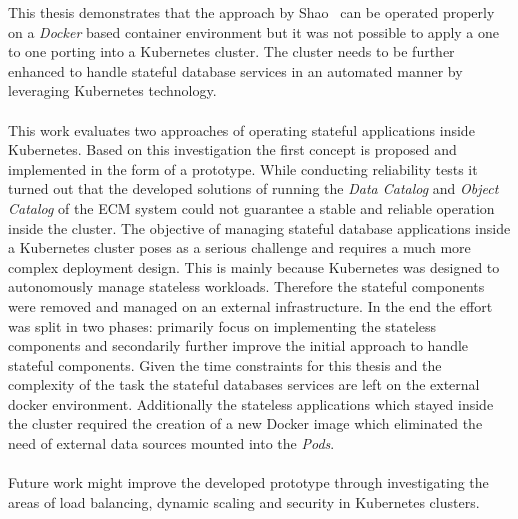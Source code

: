 This thesis demonstrates that the approach by Shao~\cite{shao} can be operated properly on a \textit{Docker} based container environment but it was not possible to apply a one to one porting into a Kubernetes cluster.
The cluster needs to be further enhanced to handle stateful database services in an automated manner by leveraging Kubernetes technology.
\\
\\
This work evaluates two approaches of operating stateful applications inside Kubernetes.
Based on this investigation the first concept is proposed and implemented in the form of a prototype.
While conducting reliability tests it turned out that the developed solutions of running the \textit{Data Catalog} and \textit{Object Catalog} of the ECM system could not guarantee a stable and reliable operation inside the cluster. 
The objective of managing stateful database applications inside a Kubernetes cluster poses as a serious challenge and requires a much more complex deployment design.
This is mainly because Kubernetes was designed to autonomously manage stateless workloads.
Therefore the stateful components were removed and managed on an external infrastructure.
In the end the effort was split in two phases: primarily focus on implementing the stateless components and secondarily further improve the initial approach to handle stateful components.
Given the time constraints for this thesis and the complexity of the task the stateful databases services are left on the external docker environment.
Additionally the stateless applications which stayed inside the cluster required the creation of a new Docker image which eliminated the need of external data sources mounted into the \textit{Pods}.
\\
\\
Future work might improve the developed prototype through investigating the areas of load balancing, dynamic scaling and security in Kubernetes clusters.
